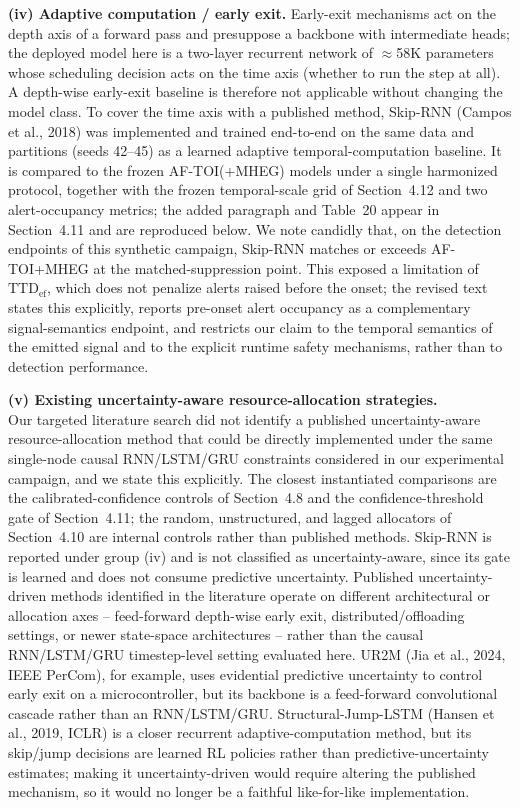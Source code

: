 \documentclass[1p,12pt,authoryear]{elsarticle}
\begin{document}
\vspace{2mm}
\noindent \textbf{(iv) Adaptive computation / early exit.} Early-exit mechanisms act on the depth axis of a forward pass and presuppose a backbone with intermediate heads; the deployed model here is a two-layer recurrent network of $\approx$58K parameters whose scheduling decision acts on the time axis (whether to run the step at all). A depth-wise early-exit baseline is therefore not applicable without changing the model class. To cover the time axis with a published method, Skip-RNN (Campos et al., 2018) was implemented and trained end-to-end on the same data and partitions (seeds 42--45) as a learned adaptive temporal-computation baseline. It is compared to the frozen AF-TOI(+MHEG) models under a single harmonized protocol, together with the frozen temporal-scale grid of Section~4.12 and two alert-occupancy metrics; the added paragraph and Table~20 appear in Section~4.11 and are reproduced below. We note candidly that, on the detection endpoints of this synthetic campaign, Skip-RNN matches or exceeds AF-TOI+MHEG at the matched-suppression point. This exposed a limitation of $\mathrm{TTD}_{\mathrm{ef}}$, which does not penalize alerts raised before the onset; the revised text states this explicitly, reports pre-onset alert occupancy as a complementary signal-semantics endpoint, and restricts our claim to the temporal semantics of the emitted signal and to the explicit runtime safety mechanisms, rather than to detection performance.

\vspace{2mm}
\noindent \textbf{(v) Existing uncertainty-aware resource-allocation strategies.}\\ Our targeted literature search did not identify a published uncertainty-aware resource-allocation method that could be directly implemented under the same single-node causal RNN/LSTM/GRU constraints considered in our experimental campaign, and we state this explicitly. The closest instantiated comparisons are the calibrated-confidence controls of Section~4.8 and the confidence-threshold gate of Section~4.11; the random, unstructured, and lagged allocators of Section~4.10 are internal controls rather than published methods. Skip-RNN is reported under group (iv) and is not classified as uncertainty-aware, since its gate is learned and does not consume predictive uncertainty. Published uncertainty-driven methods identified in the literature operate on different architectural or allocation axes -- feed-forward depth-wise early exit, distributed/offloading settings, or newer state-space architectures -- rather than the causal RNN/LSTM/GRU timestep-level setting evaluated here. UR2M (Jia et al., 2024, IEEE PerCom), for example, uses evidential predictive uncertainty to control early exit on a microcontroller, but its backbone is a feed-forward convolutional cascade rather than an RNN/LSTM/GRU. Structural-Jump-LSTM (Hansen et al., 2019, ICLR) is a closer recurrent adaptive-computation method, but its skip/jump decisions are learned RL policies rather than predictive-uncertainty estimates; making it uncertainty-driven would require altering the published mechanism, so it would no longer be a faithful like-for-like implementation.
\end{document}
